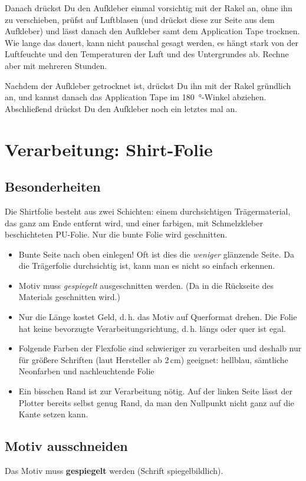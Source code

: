 \documentclass{\basedir/fablab-document}
\begin{document}
Danach drückst Du den Aufkleber einmal vorsichtig mit der Rakel an, ohne ihn zu verschieben, prüfst auf Luftblasen (und drückst diese zur Seite aus dem Aufkleber) und lässt danach den Aufkleber samt dem Application Tape trocknen.
Wie lange das dauert, kann nicht pauschal gesagt werden, es hängt stark von der Luftfeuchte und den Temperaturen der Luft und des Untergrundes ab.
Rechne aber mit mehreren Stunden.

Nachdem der Aufkleber getrocknet ist, drückst Du ihn mit der Rakel gründlich an, und kannst danach das Application Tape im \SI{180}{\degree}-Winkel abziehen.
Abschließend drückst Du den Aufkleber noch ein letztes mal an. 

\section{Verarbeitung: Shirt-Folie} \label{VerarbeitungShirtfolie}
\subsection{Besonderheiten}
Die Shirtfolie besteht aus zwei Schichten: einem durchsichtigen Trägermaterial, das ganz am Ende entfernt wird, und einer farbigen, mit Schmelzkleber beschichteten PU-Folie.
Nur die bunte Folie wird geschnitten.

\begin{itemize}
 \item Bunte Seite nach oben einlegen! Oft ist dies die \emph{weniger} glänzende Seite. Da die Trägerfolie durchsichtig ist, kann man es nicht so einfach erkennen.
 \item Motiv muss \emph{gespiegelt} ausgeschnitten werden. (Da in die Rückseite des Materials geschnitten wird.)
 \item Nur die Länge kostet Geld, d.\,h. das Motiv auf Querformat drehen. Die Folie hat keine bevorzugte Verarbeitungsrichtung, d.\,h. längs oder quer ist egal.
 \item Folgende Farben der Flexfolie sind schwieriger zu verarbeiten und deshalb nur für größere Schriften (laut Hersteller ab 2\,cm) geeignet: hellblau, sämtliche Neonfarben und nachleuchtende Folie
 \item Ein bisschen Rand ist zur Verarbeitung nötig. Auf der linken Seite lässt der Plotter bereits selbst genug Rand, da man den Nullpunkt nicht ganz auf die Kante setzen kann.
\end{itemize}

\subsection{Motiv ausschneiden}
Das Motiv muss \textbf{gespiegelt} werden (Schrift spiegelbildlich).
\end{document}

